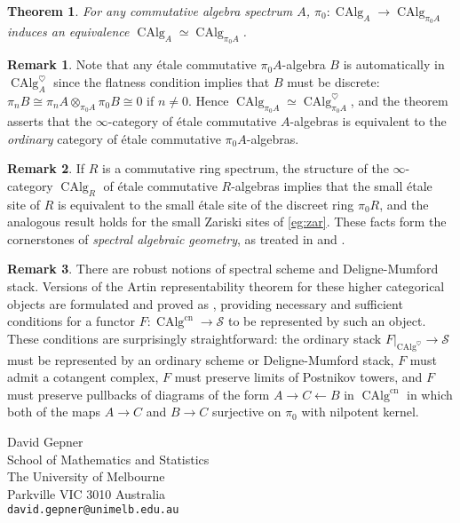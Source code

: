 \documentclass[12pt]{article}
\newtheorem{theorem}{Theorem}[subsection]
\theoremstyle{definition}
\newtheorem{remark}{Remark}[subsection]
\renewcommand{\S}{\mathcal{S}}
\renewcommand{\i}{\infty}
\DeclareMathOperator{\et}{\acute{e}t}
\DeclareMathOperator{\CAlg}{CAlg}
\newcommand{\cn}{\mathrm{cn}}
\begin{document}
\begin{theorem}{\em \cite[Corollary 7.5.4.3]{HA}}\label{thm:et}
For any commutative algebra spectrum $A$, 
$
\pi_0 : \CAlg_A\to\CAlg_{\pi_0 A}
$
induces an equivalence  $\CAlg_A^{\et}\simeq\CAlg_{\pi_0 A}^{\et}$.
\end{theorem}



\begin{remark}
Note that any \'etale commutative $\pi_0 A$-algebra $B$ is automatically in $\CAlg_A^\heartsuit$ since the flatness condition implies that $B$ must be discrete: $\pi_n B\cong\pi_n A\otimes_{\pi_0 A}\pi_0 B\cong 0$ if $n\neq 0$.
Hence $\CAlg_{\pi_0 A}^{\et}\simeq\CAlg_{\pi_0 A}^{\heartsuit\et}$, and the theorem asserts that the $\infty$-category of \'etale commutative $A$-algebras is equivalent to the {\em ordinary} category of \'etale commutative $\pi_0 A$-algebras.
\end{remark}


\begin{remark}
If $R$ is a commutative ring spectrum, the structure of the $\i$-category $\CAlg_R^{\et}$ of \'etale commutative $R$-algebras implies that the small \'etale site of $R$ is equivalent to the small \'etale site of the discreet ring $\pi_0 R$, and the analogous result holds for the small Zariski sites of \autoref{eg:zar}.
These facts form the cornerstones of {\em spectral algebraic geometry}, as treated in \cite{SAG} and \cite{TV08}.
\end{remark}
\begin{remark}
There are robust notions of spectral scheme and Deligne-Mumford stack.
Versions of the Artin representability
theorem for these higher categorical objects are formulated and proved as \cite[Theorems 18.1.0.1 and 18.1.0.2]{SAG}, providing necessary and sufficient conditions for a functor $F:\CAlg^{\cn}\to\S$ to be represented by such an object.
These conditions are surprisingly straightforward: the ordinary stack $F|_{\CAlg^\heartsuit}\to\S$ must be represented by an ordinary scheme or Deligne-Mumford stack, $F$ must admit a cotangent complex, $F$ must preserve limits of Postnikov towers, and $F$ must preserve pullbacks of diagrams of the form $A\to C\leftarrow B$ in $\CAlg^{\cn}$ in which both of the maps $A\to C$ and $B\to C$ surjective on $\pi_0$ with nilpotent kernel.
\end{remark}


\printindex

{\small

}


\vspace{30pt}
\small
\noindent
David Gepner\\
School of Mathematics and Statistics\\
The University of Melbourne\\
Parkville VIC 3010 Australia\\
\texttt{david.gepner@unimelb.edu.au}
\end{document}
